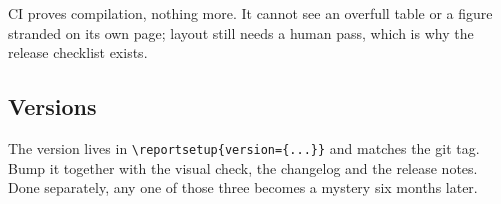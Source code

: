 CI proves compilation, nothing more. It cannot see an overfull table or a figure stranded
on its own page; layout still needs a human pass, which is why the release checklist
exists.

\subsection{Versions}

The version lives in \verb|\reportsetup{version={...}}| and matches the git tag. Bump it
together with the visual check, the changelog and the release notes. Done separately,
any one of those three becomes a mystery six months later.
